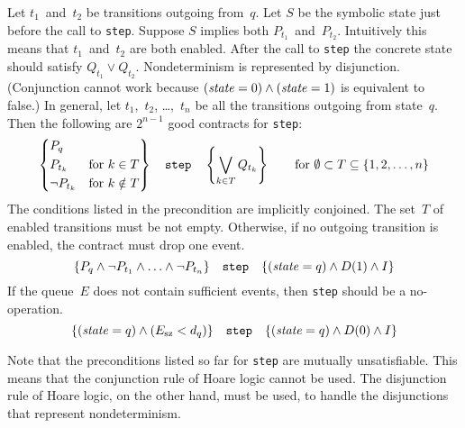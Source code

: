 \documentclass{article} %
\newcommand{\3}[3]{\{\,#1\,\}\;#2\;\{\,#3\,\}}
\begin{document}
Let $t_1$~and~$t_2$ be transitions outgoing from~$q$.
Let $S$ be the symbolic state just before the call to {\tt step}.
Suppose $S$ implies both $P_{t_1}$~and~$P_{t_2}$.
Intuitively this means that $t_1$~and~$t_2$ are both enabled.
After the call to {\tt step} the concrete state should satisfy $Q_{t_1}\lor Q_{t_2}$.
Nondeterminism is represented by disjunction.
(Conjunction cannot work because $({\it state}=0)\land({\it state}=1)$ is equivalent to false.)
In general, let $t_1$,~$t_2$, \dots,~$t_n$ be all the transitions outgoing from state~$q$.
Then the following are $2^{n-1}$ good contracts for {\tt step}:
\[
  \left\{\begin{aligned}
  &P_q&&\\
  &P_{t_k}  &&\text{for $k\in T$} \\
  &\lnot P_{t_k}  &&\text{for $k\notin T$}
  \end{aligned}\right\}
  \quad\text{\tt step}\quad
  \left\{\bigvee_{k\in T}Q_{t_k}\right\}
  \qquad\text{for $\emptyset\subset T\subseteq \{1,2,\ldots,n\}$}
\]
The conditions listed in the precondition are implicitly conjoined.
The set~$T$ of enabled transitions must be not empty.
Otherwise, if no outgoing transition is enabled, the contract must drop one event.
\[
  \{P_q\land\lnot P_{t_1}\land\ldots\land\lnot P_{t_n}\}
  \quad\text{\tt step}\quad
  \{({\it state}=q)\land D(1)\land I\}
\]
If the queue~$E$ does not contain sufficient events, then {\tt step} should be a no-operation.
\[
  \{({\it state}=q)\land(E_{\rm sz}<d_q)\}
  \quad\text{\tt step}\quad
  \{({\it state}=q)\land D(0)\land I\}
\]

Note that the preconditions listed so far for {\tt step} are mutually unsatisfiable.
This means that the conjunction rule of Hoare logic cannot be used.
The disjunction rule of Hoare logic, on the other hand, must be used, to handle the disjunctions that represent nondeterminism.
\end{document}
